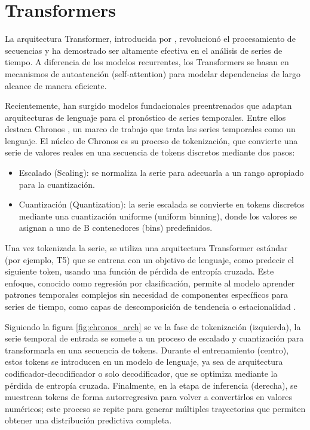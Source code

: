 \section{Transformers}

La arquitectura Transformer, introducida por \cite{Vaswani:2017}, revolucionó el procesamiento de secuencias y ha demostrado ser altamente efectiva en el análisis de series de tiempo. A diferencia de los modelos recurrentes, los Transformers se basan en mecanismos de autoatención (self-attention) para modelar dependencias de largo alcance de manera eficiente.

Recientemente, han surgido modelos fundacionales preentrenados que adaptan arquitecturas de lenguaje para el pronóstico de series temporales. Entre ellos destaca Chronos \cite{Chronos:2024}, un marco de trabajo que trata las series temporales como un lenguaje. El núcleo de Chronos es su proceso de tokenización, que convierte una serie de valores reales en una secuencia de tokens discretos mediante dos pasos:
\begin{itemize}
    \item 	Escalado (Scaling): se normaliza la serie para adecuarla a un rango apropiado para la cuantización.
    \item 	Cuantización (Quantization): la serie escalada se convierte en tokens discretos mediante una cuantización uniforme (uniform binning), donde los valores se asignan a uno de B contenedores (bins) predefinidos.
\end{itemize}

Una vez tokenizada la serie, se utiliza una arquitectura Transformer estándar (por ejemplo, T5) que se entrena con un objetivo de lenguaje, como predecir el siguiente token, usando una función de pérdida de entropía cruzada. Este enfoque, conocido como regresión por clasificación, permite al modelo aprender patrones temporales complejos sin necesidad de componentes específicos para series de tiempo, como capas de descomposición de tendencia o estacionalidad \cite{Chronos:2024}.

 Siguiendo la figura \ref{fig:chronos_arch} se ve la fase de tokenización (izquierda), la serie temporal de entrada se somete a un proceso de escalado y cuantización para transformarla en una secuencia de tokens. Durante el entrenamiento (centro), estos tokens se introducen en un modelo de lenguaje, ya sea de arquitectura codificador-decodificador o solo decodificador, que se optimiza mediante la pérdida de entropía cruzada. Finalmente, en la etapa de inferencia (derecha), se muestrean tokens de forma autorregresiva para volver a convertirlos en valores numéricos; este proceso se repite para generar múltiples trayectorias que permiten obtener una distribución predictiva completa.

